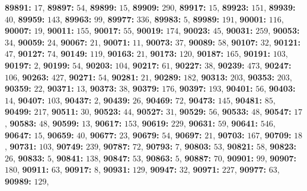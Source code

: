 \textsf{\bfseries 89891:} $17$, \textsf{\bfseries 89897:} $54$, \textsf{\bfseries 89899:} $15$, \textsf{\bfseries 89909:} $290$, \textsf{\bfseries 89917:} $15$, \textsf{\bfseries 89923:} $151$, \textsf{\bfseries 89939:} $40$, \textsf{\bfseries 89959:} $143$, \textsf{\bfseries 89963:} $99$, \textsf{\bfseries 89977:} $336$, \textsf{\bfseries 89983:} $5$, \textsf{\bfseries 89989:} $191$, \textsf{\bfseries 90001:} $116$, \textsf{\bfseries 90007:} $19$, \textsf{\bfseries 90011:} $155$, \textsf{\bfseries 90017:} $55$, \textsf{\bfseries 90019:} $174$, \textsf{\bfseries 90023:} $45$, \textsf{\bfseries 90031:} $259$, \textsf{\bfseries 90053:} $34$, \textsf{\bfseries 90059:} $24$, \textsf{\bfseries 90067:} $21$, \textsf{\bfseries 90071:} $11$, \textsf{\bfseries 90073:} $37$, \textsf{\bfseries 90089:} $58$, \textsf{\bfseries 90107:} $32$, \textsf{\bfseries 90121:} $47$, \textsf{\bfseries 90127:} $74$, \textsf{\bfseries 90149:} $119$, \textsf{\bfseries 90163:} $21$, \textsf{\bfseries 90173:} $120$, \textsf{\bfseries 90187:} $165$, \textsf{\bfseries 90191:} $103$, \textsf{\bfseries 90197:} $2$, \textsf{\bfseries 90199:} $54$, \textsf{\bfseries 90203:} $104$, \textsf{\bfseries 90217:} $61$, \textsf{\bfseries 90227:} $38$, \textsf{\bfseries 90239:} $473$, \textsf{\bfseries 90247:} $106$, \textsf{\bfseries 90263:} $427$, \textsf{\bfseries 90271:} $54$, \textsf{\bfseries 90281:} $21$, \textsf{\bfseries 90289:} $182$, \textsf{\bfseries 90313:} $203$, \textsf{\bfseries 90353:} $203$, \textsf{\bfseries 90359:} $22$, \textsf{\bfseries 90371:} $13$, \textsf{\bfseries 90373:} $38$, \textsf{\bfseries 90379:} $176$, \textsf{\bfseries 90397:} $193$, \textsf{\bfseries 90401:} $56$, \textsf{\bfseries 90403:} $14$, \textsf{\bfseries 90407:} $103$, \textsf{\bfseries 90437:} $2$, \textsf{\bfseries 90439:} $26$, \textsf{\bfseries 90469:} $72$, \textsf{\bfseries 90473:} $145$, \textsf{\bfseries 90481:} $85$, \textsf{\bfseries 90499:} $217$, \textsf{\bfseries 90511:} $30$, \textsf{\bfseries 90523:} $44$, \textsf{\bfseries 90527:} $31$, \textsf{\bfseries 90529:} $56$, \textsf{\bfseries 90533:} $48$, \textsf{\bfseries 90547:} $17$, \textsf{\bfseries 90583:} $48$, \textsf{\bfseries 90599:} $13$, \textsf{\bfseries 90617:} $153$, \textsf{\bfseries 90619:} $229$, \textsf{\bfseries 90631:} $59$, \textsf{\bfseries 90641:} $546$, \textsf{\bfseries 90647:} $15$, \textsf{\bfseries 90659:} $40$, \textsf{\bfseries 90677:} $23$, \textsf{\bfseries 90679:} $54$, \textsf{\bfseries 90697:} $21$, \textsf{\bfseries 90703:} $167$, \textsf{\bfseries 90709:} $18$, \textsf{\bfseries 90731:} $103$, \textsf{\bfseries 90749:} $239$, \textsf{\bfseries 90787:} $72$, \textsf{\bfseries 90793:} $7$, \textsf{\bfseries 90803:} $53$, \textsf{\bfseries 90821:} $58$, \textsf{\bfseries 90823:} $26$, \textsf{\bfseries 90833:} $5$, \textsf{\bfseries 90841:} $138$, \textsf{\bfseries 90847:} $53$, \textsf{\bfseries 90863:} $5$, \textsf{\bfseries 90887:} $70$, \textsf{\bfseries 90901:} $99$, \textsf{\bfseries 90907:} $180$, \textsf{\bfseries 90911:} $63$, \textsf{\bfseries 90917:} $8$, \textsf{\bfseries 90931:} $129$, \textsf{\bfseries 90947:} $32$, \textsf{\bfseries 90971:} $227$, \textsf{\bfseries 90977:} $63$, \textsf{\bfseries 90989:} $129$, 
